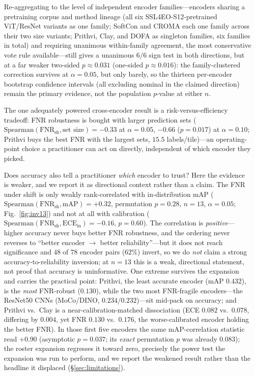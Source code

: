 \documentclass[journal]{IEEEtran}
\renewcommand{\_}{\textunderscore\allowbreak}
\begin{document}
Re-aggregating to the level of independent encoder families---encoders sharing a pretraining
corpus and method lineage (all six SSL4EO-S12-pretrained ViT/ResNet variants as one family; SoftCon
and CROMA each one family across their two size variants; Prithvi, Clay, and DOFA as singleton
families, six families in total) and requiring unanimous within-family agreement, the most
conservative vote rule available---still gives a unanimous $6/6$ sign test in both directions, but
at a far weaker two-sided $p\approx0.031$ (one-sided $p\approx0.016$): the family-clustered
correction survives at $\alpha{=}0.05$, but only barely, so the thirteen per-encoder bootstrap
confidence intervals (all excluding nominal in the claimed direction) remain the primary evidence,
not the population $p$-value at either $n$.

The one adequately powered cross-encoder result is a risk-versus-efficiency tradeoff: FNR robustness is
bought with larger prediction sets
($\mathrm{Spearman}(\mathrm{FNR}_{\mathrm{sh}},\text{set size})=-0.33$ at $\alpha{=}0.05$, $-0.66$
($p{=}0.017$) at $\alpha{=}0.10$; Prithvi buys the best FNR with the largest sets, $15.5$ labels/tile)---an
operating-point choice a practitioner can act on directly, independent of which encoder they picked.

Does accuracy also tell a practitioner \emph{which} encoder to trust? Here the evidence is weaker, and we
report it as directional context rather than a claim. The FNR under shift is only weakly rank-correlated
with in-distribution mAP
($\mathrm{Spearman}(\mathrm{FNR}_{\mathrm{sh}},\mathrm{mAP})=+0.32$, permutation $p{=}0.28$, $n{=}13$,
$\alpha{=}0.05$; Fig.~\ref{fig:inv13}) and not at all with calibration
($\mathrm{Spearman}(\mathrm{FNR}_{\mathrm{sh}},\mathrm{ECE}_{\mathrm{in}})=-0.16$, $p{=}0.60$). The
correlation is \emph{positive}---higher accuracy never buys better FNR robustness, and the ordering never
reverses to ``better encoder $\to$ better reliability''---but it does not reach significance and $48$ of
$78$ encoder pairs ($62\%$) invert, so we do \emph{not} claim a strong accuracy-to-reliability inversion;
at $n{=}13$ this is a weak, directional statement, not proof that accuracy is uninformative. One extreme
survives the expansion and carries the practical point: Prithvi, the least accurate encoder (mAP
$0.432$), is the \emph{most} FNR-robust ($0.130$), while the two most FNR-fragile encoders---the ResNet50
CNNs (MoCo/DINO, $0.234$/$0.232$)---sit mid-pack on accuracy; and Prithvi vs.\ Clay is a
near-calibration-matched dissociation (ECE $0.082$ vs.\ $0.078$, differing by $0.004$, yet FNR $0.130$
vs.\ $0.176$, the worse-calibrated encoder holding the better FNR). In those first five encoders the same
mAP-correlation statistic read $+0.90$ (asymptotic $p{=}0.037$; its \emph{exact} permutation $p$ was
already $0.083$); the roster expansion regresses it toward zero, precisely the power test the expansion
was run to perform, and we report the weakened result rather than the headline it displaced
(\S\ref{sec:limitations}).
\end{document}
